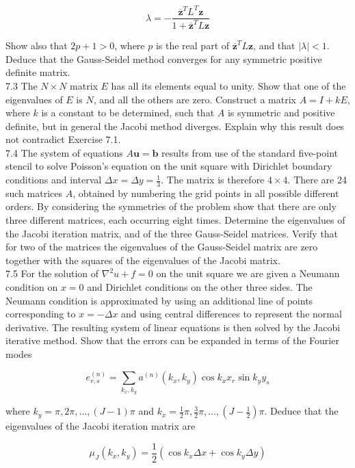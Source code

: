 \documentclass[10pt]{article}
\begin{document}
\[
\lambda=-\frac{\overline{\mathbf{z}}^{T} L^{T} \mathbf{z}}{1+\overline{\mathbf{z}}^{T} L \mathbf{z}}
\]

Show also that \(2 p+1>0\), where \(p\) is the real part of \(\overline{\mathbf{z}}^{T} L \mathbf{z}\), and that \(|\lambda|<1\). Deduce that the Gauss-Seidel method converges for any symmetric positive definite matrix.\\
7.3 The \(N \times N\) matrix \(E\) has all its elements equal to unity. Show that one of the eigenvalues of \(E\) is \(N\), and all the others are zero. Construct a matrix \(A=I+k E\), where \(k\) is a constant to be determined, such that \(A\) is symmetric and positive definite, but in general the Jacobi method diverges. Explain why this result does not contradict Exercise 7.1.\\
7.4 The system of equations \(A \mathbf{u}=\mathbf{b}\) results from use of the standard five-point stencil to solve Poisson's equation on the unit square with Dirichlet boundary conditions and interval \(\Delta x=\Delta y=\frac{1}{3}\). The matrix is therefore \(4 \times 4\). There are 24 such matrices \(A\), obtained by numbering the grid points in all possible different orders. By considering the symmetries of the problem show that there are only three different matrices, each occurring eight times. Determine the eigenvalues of the Jacobi iteration matrix, and of the three Gauss-Seidel matrices. Verify that for two of the matrices the eigenvalues of the Gauss-Seidel matrix are zero together with the squares of the eigenvalues of the Jacobi matrix.\\
7.5 For the solution of \(\nabla^{2} u+f=0\) on the unit square we are given a Neumann condition on \(x=0\) and Dirichlet conditions on the other three sides. The Neumann condition is approximated by using an additional line of points corresponding to \(x=-\Delta x\) and using central differences to represent the normal derivative. The resulting system of linear equations is then solved by the Jacobi iterative method. Show that the errors can be expanded in terms of the Fourier modes

\[
e_{r, s}^{(n)}=\sum_{k_{x}, k_{y}} a^{(n)}\left(k_{x}, k_{y}\right) \cos k_{x} x_{r} \sin k_{y} y_{s}
\]

where \(k_{y}=\pi, 2 \pi, \ldots,(J-1) \pi\) and \(k_{x}=\frac{1}{2} \pi, \frac{3}{2} \pi, \ldots,\left(J-\frac{1}{2}\right) \pi\). Deduce that the eigenvalues of the Jacobi iteration matrix are

\[
\mu_{J}\left(k_{x}, k_{y}\right)=\frac{1}{2}\left(\cos k_{x} \Delta x+\cos k_{y} \Delta y\right)
\]
\end{document}
